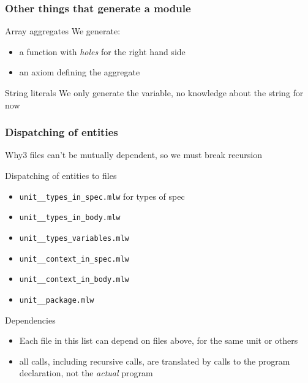 \documentclass{beamer}
\newenvironment{specialframe}{%
  \begin{frame}[fragile,environment=specialframe]}{\end{frame}}
\begin{document}
\begin{specialframe}\frametitle{Other things that generate a module}

   \begin{block}{Array aggregates}
      We generate:
   \begin{itemize}
      \item a function with \emph{holes} for the right hand side
      \item an axiom defining the aggregate
   \end{itemize}
   \end{block}
   \begin{block}{String literals}
      We only generate the variable, no knowledge about the string for now
   \end{block}
\end{specialframe}

\begin{specialframe}\frametitle{Dispatching of entities}

Why3 files can't be mutually dependent, so we must break recursion
\vspace{-1em}

   \begin{block}{Dispatching of entities to files}
      \begin{itemize}
         \item \verb|unit__types_in_spec.mlw| for types of spec
         \item \verb|unit__types_in_body.mlw|
         \item \verb|unit__types_variables.mlw|
         \item \verb|unit__context_in_spec.mlw|
         \item \verb|unit__context_in_body.mlw|
         \item \verb|unit__package.mlw|
      \end{itemize}
   \end{block}
   \begin{block}{Dependencies}
      \begin{itemize}
         \item Each file in this list can depend on files above, for the same unit or others
         \item all calls, including recursive calls, are translated by calls to
the program declaration, not the \emph{actual} program
      \end{itemize}
   \end{block}
\end{specialframe}
\end{document}
